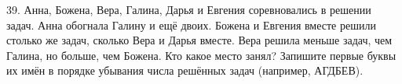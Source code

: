 39. Анна, Божена, Вера, Галина, Дарья и Евгения соревновались в решении задач. Анна обогнала Галину и ещё двоих. Божена и Евгения вместе решили столько же задач, сколько Вера и Дарья вместе. Вера решила меньше задач, чем Галина, но больше, чем Божена. Кто какое место занял? Запишите первые буквы их имён в порядке убывания числа решённых задач (например, АГДБЕВ).\\
